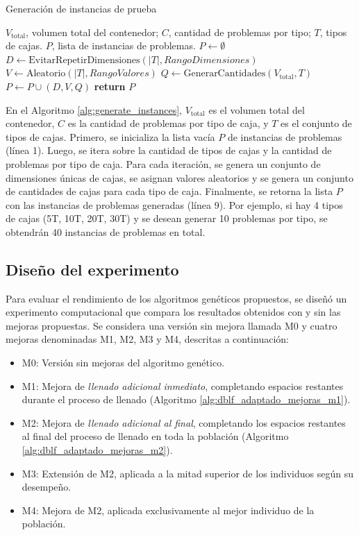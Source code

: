 \begin{algorithm}[H]
    \caption{Generación de instancias de prueba}
    \label{alg:generate_instances}
    \begin{algorithmic}[1]
        \Require $V_{\text{total}}$, volumen total del contenedor; $C$, cantidad de problemas por tipo; $T$, tipos de cajas.
        \Ensure $P$, lista de instancias de problemas.
        \State $P \gets \emptyset$
        \State $D \gets \text{EvitarRepetirDimensiones}(|T|, RangoDimensiones)$
        \State $V \gets \text{Aleatorio}(|T|, RangoValores)$
        \State $Q \gets \text{GenerarCantidades}(V_{\text{total}}, T)$
        \State $P \gets P \cup (D, V, Q)$
        \EndFor
        \EndFor
        \State \textbf{return} $P$
    \end{algorithmic}
\end{algorithm}

En el Algoritmo \ref{alg:generate_instances}, $V_{\text{total}}$ es el volumen total del contenedor, $C$ es la cantidad de problemas por tipo de caja, y $T$ es el conjunto de tipos de cajas. Primero, se inicializa la lista vacía $P$ de instancias de problemas (línea 1). Luego, se itera sobre la cantidad de tipos de cajas y la cantidad de problemas por tipo de caja. Para cada iteración, se genera un conjunto de dimensiones únicas de cajas, se asignan valores aleatorios y se genera un conjunto de cantidades de cajas para cada tipo de caja. Finalmente, se retorna la lista $P$ con las instancias de problemas generadas (línea 9). Por ejemplo, si hay 4 tipos de cajas (5T, 10T, 20T, 30T) y se desean generar 10 problemas por tipo, se obtendrán 40 instancias de problemas en total.

\subsection{Diseño del experimento}

Para evaluar el rendimiento de los algoritmos genéticos propuestos, se diseñó un experimento computacional que compara los resultados obtenidos con y sin las mejoras propuestas. Se considera una versión sin mejora llamada M0 y cuatro mejoras denominadas M1, M2, M3 y M4, descritas a continuación:

\begin{itemize}
    \item M0: Versión sin mejoras del algoritmo genético.
    \item M1: Mejora de \textit{llenado adicional inmediato}, completando espacios restantes durante el proceso de llenado (Algoritmo \ref{alg:dblf_adaptado_mejoras_m1}).
    \item M2: Mejora de \textit{llenado adicional al final}, completando los espacios restantes al final del proceso de llenado en toda la población (Algoritmo \ref{alg:dblf_adaptado_mejoras_m2}).
    \item M3: Extensión de M2, aplicada a la mitad superior de los individuos según su desempeño.
    \item M4: Mejora de M2, aplicada exclusivamente al mejor individuo de la población.
\end{itemize}

